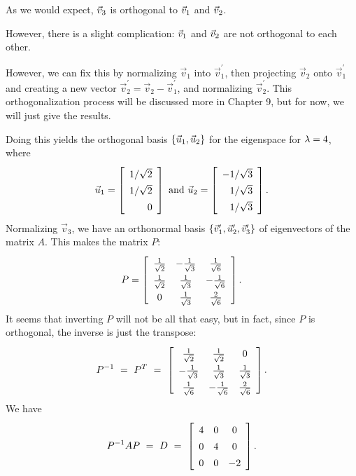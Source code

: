 \documentclass{ximera}
\begin{document}
\begin{example}
  As we would expect,
  $\vec{v}_3$ is orthogonal to $\vec{v}_1$ and
  $\vec{v}_2$. 
  
  However, there is a slight complication: $\vec{v}_1$
  and $\vec{v}_2$ are not orthogonal to each other. 
  
  However, we can fix
  this by normalizing $\vec{v}_1$ into $\vec{v}_1^{\prime}$, then projecting $\vec{v}_2$ onto $\vec{v}_1^{\prime}$ and creating a new vector $\vec{v}_2^{\prime}=\vec{v}_2-\vec{v}_1^\prime$, and normalizing $\vec{v}_2^\prime$. This orthogonalization process will be discussed more in Chapter 9, but for now, we will just give the results.

  Doing this yields the orthogonal basis
  $\left\{\vec{u}_1,\vec{u}_2\right\}$ for the eigenspace for $\lambda=4$,
  where
  \begin{equation*}
    \vect{u}_1 = \startmat{r} 1/\sqrt{2} \\ 1/\sqrt{2} \\ 0 \stopmat
    \quad\mbox{and}\quad
    \vect{u}_2 = \startmat{r} -1/\sqrt{3} \\ 1/\sqrt{3} \\ 1/\sqrt{3} \stopmat.
\end{equation*}
Normalizing $\vec{v}_3$, we have an orthonormal basis
$\left\{\vec{v}_1^\prime,\vec{u}_2^\prime,\vec{v}_3^\prime\right\}$ of eigenvectors of the
matrix $A$. This makes the matrix $P$:
\begin{equation*}
    \def\arraystretch{1.4}
    P = \startmat{ccc}
      \frac{1}{\sqrt{2}} & -\frac{1}{\sqrt{3}} & \frac{1}{\sqrt{6}}  \\
      \frac{1}{\sqrt{2}} & \frac{1}{\sqrt{3}}  & -\frac{1}{\sqrt{6}} \\
      0                  & \frac{1}{\sqrt{3}}  & \frac{2}{\sqrt{6}}  \\
    \stopmat.
\end{equation*}
It seems that inverting $P$ will not be all that easy, but in fact,
since $P$ is orthogonal, the inverse is just the transpose:
\begin{equation*}
    \def\arraystretch{1.4}
    P^{-1}
    ~=~ P^T
    ~=~ \startmat{ccc}
      \frac{1}{\sqrt{2}}  & \frac{1}{\sqrt{2}}  & 0 \\
      -\frac{1}{\sqrt{3}} & \frac{1}{\sqrt{3}}  & \frac{1}{\sqrt{3}} \\
      \frac{1}{\sqrt{6}}  & -\frac{1}{\sqrt{6}} & \frac{2}{\sqrt{6}} \\
    \stopmat.
\end{equation*}
We have
\begin{equation*}
    P^{-1}AP
    ~=~ D
    ~=~ \startmat{ccc} 4 & 0 & 0 \\ 0 & 4 & 0 \\ 0 & 0 & -2 \stopmat.
\end{equation*}

\end{example}
\end{document}
